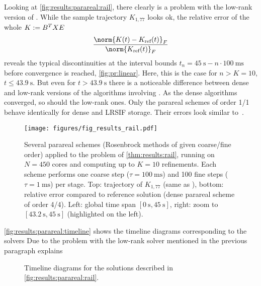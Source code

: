 Looking at \autoref{fig:results:parareal:rail},
there clearly is a problem with the low-rank version of .
While the sample trajectory $K_{1,77}$ looks ok,
the relative error of the whole $K := B^T X E$
\begin{equation}
  \frac{\norm{K(t) - K_\text{ref}(t)}_F}{\norm{K_\text{ref}(t)}_F}
\end{equation}
reveals the typical discontinuities at the interval bounds
$t_n = \SI{45}{\second} - n \cdot \SI{100}{\milli\second}$
before convergence is reached,
\cf \autoref{fig:pr:linear}.
Here, this is the case for $n > K = 10$, \ie $t \leq \SI{43.9}{\second}$.
But even for $t > \SI{43.9}{\second}$ there is a noticeable difference between
dense and low-rank versions of the algorithms involving .
As the dense algorithms converged, so should the low-rank ones.
Only the parareal schemes of order 1/1 behave identically for dense and \ac{LRSIF} storage.
Their errors look similar to~\cite[Fig.~1]{Lang2015}.

\begin{figure}[t]
  \centering
  \texttt{[image: figures/fig\_results\_rail.pdf]}
  \caption[Parareal method applied to Rail problem]{%
    Several parareal schemes (Rosenbrock methods of given coarse/fine order)
    applied to the problem of \autoref{thm:results:rail},
    running on $N=450$ cores and
    computing up to $K=10$ refinements.
    Each scheme performs
    one coarse step ($\tau=\SI{100}{\milli\second}$) and
    100 fine steps ($\tau=\SI{1}{\milli\second}$) per stage.
    Top: trajectory of $K_{1,77}$ (same as \cite[Fig.~1]{Lang2015}),
    bottom: relative error compared to reference solution
    (dense parareal scheme of order 4/4).
    Left: global time span $[\SI{0}{\second}, \SI{45}{\second}]$,
    right: zoom to $[\SI[round-mode=off]{43.2}{\second}, \SI{45}{\second}]$ (highlighted on the left).
  }
  \label{fig:results:parareal:rail}
\end{figure}

\autoref{fig:results:parareal:timeline} shows the timeline diagrams corresponding to the solvers
Due to the problem with the low-rank  solver mentioned in the previous paragraph explains

\begin{figure}[t]
  \missingfigure{}
  \caption[Timeline diagrams for parareal method applied to Rail problem]{%
    Timeline diagrams for the solutions described in \autoref{fig:results:parareal:rail}.
  }
  \label{fig:results:parareal:timeline}
\end{figure}

